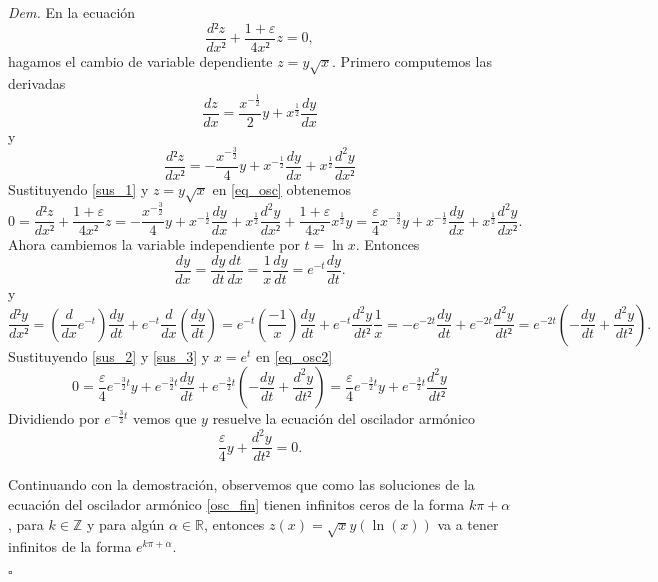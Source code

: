 \documentclass{article}
\newenvironment{demo}{\noindent\emph{Dem.}}{{\hspace*{\fill}$\square$} \newline\vspace{5pt}}
\renewcommand{\epsilon}{\varepsilon}
\begin{document}
\begin{demo} En la ecuación 
\begin{equation}\label{eq_osc}\frac{d²z}{dx²}+\frac{1+\epsilon}{4x²}z=0,
\end{equation}
hagamos el cambio de variable dependiente $z=y\sqrt{x}$. Primero computemos las derivadas
\[
\frac{dz}{dx}=\frac{x^{-\frac{1}{2}}}{2}y+x^{\frac{1}{2}}\frac{dy}{dx}
\]
y
\begin{equation}\label{sus_1}
\frac{d²z}{dx²}=-\frac{x^{-\frac{3}{2}}}{4}y+ x^{-\frac{1}{2}}\frac{dy}{dx} +x^{\frac{1}{2}}\frac{d^2y}{dx²}
\end{equation}
Sustituyendo \eqref{sus_1} y  $z=y\sqrt{x}$ en \eqref{eq_osc} obtenemos
\begin{equation}\label{eq_osc2}
0=\frac{d²z}{dx²}+\frac{1+\epsilon}{4x²}z=-\frac{x^{-\frac{3}{2}}}{4}y+ x^{-\frac{1}{2}}\frac{dy}{dx} +x^{\frac{1}{2}}\frac{d^2y}{dx²}+\frac{1+\epsilon}{4x²}x^{\frac{1}{2}}y=\boxed{\frac{\epsilon}{4}x^{-\frac{3}{2}}y+ x^{-\frac{1}{2}}\frac{dy}{dx} +x^{\frac{1}{2}}\frac{d^2y}{dx²}}.
\end{equation}
Ahora cambiemos la variable independiente por $t=\ln x$. Entonces
\begin{equation}\label{sus_2}\frac{dy}{dx}=\frac{dy}{dt}\frac{dt}{dx}=\frac{1}{x}\frac{dy}{dt}=\boxed{
e^{-t}\frac{dy}{dt}}.
\end{equation}
y
\begin{equation}\label{sus_3}\frac{d²y}{dx²}=\left(\frac{d}{dx}e^{-t}\right)\frac{dy}{dt}+
e^{-t}\frac{d}{dx}\left(\frac{dy}{dt}\right)=e^{-t}\left(\frac{-1}{x}\right)\frac{dy}{dt}+
e^{-t}\frac{d^2y}{dt²}\frac{1}{x}=-e^{-2t}\frac{dy}{dt}+
e^{-2t}\frac{d^2y}{dt²}=\boxed{e^{-2t}\left(-\frac{dy}{dt}+
\frac{d^2y}{dt²}\right)}.
\end{equation}
Sustituyendo \eqref{sus_2} y \eqref{sus_3} y $x=e^t$ en \eqref{eq_osc2}
\[
0=\frac{\epsilon}{4}e^{-\frac{3}{2}t}y+e^{-\frac{3}{2}t}\frac{dy}{dt}+e^{-\frac{3}{2}t}\left(-\frac{dy}{dt}+
\frac{d^2y}{dt²}\right)=\frac{\epsilon}{4}e^{-\frac{3}{2}t}y+e^{-\frac{3}{2}t}\frac{d^2y}{dt²}
\]
Dividiendo por $e^{-\frac{3}{2}t}$ vemos que $y$ resuelve la ecuación del oscilador armónico
\begin{equation}\label{osc_fin}
\boxed{\frac{\epsilon}{4}y+\frac{d^2y}{dt²}=0}.
\end{equation}


Continuando con la demostración, observemos que como las soluciones de la ecuación del oscilador armónico \eqref{osc_fin} tienen infinitos ceros de la forma $k\pi+\alpha$, para $k\in\mathbb{Z}$ y para algún $\alpha\in\mathbb{R}$, entonces $z(x)=\sqrt{x}y(\ln(x))$ va a tener infinitos
de la forma $e^{k\pi+\alpha}$. 


\end{demo}
\end{document}
